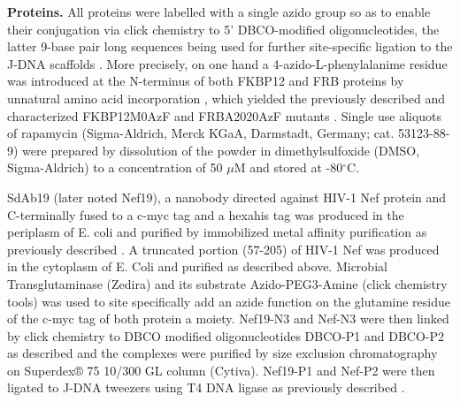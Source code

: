 \documentclass{biophys-new}
\begin{document}
\textbf{Proteins.} All proteins were labelled with a single azido group so as to enable their conjugation via click chemistry to 5' DBCO-modified oligonucleotides, the latter 9-base pair long sequences being used for further site-specific ligation to the J-DNA scaffolds  \cite{kostrz2019}. More precisely, on one hand a 4-azido-L-phenylalanime residue was introduced at the N-terminus of both FKBP12 and FRB proteins by unnatural amino acid incorporation \cite{chin2002, young2010, lajoie2013}, which yielded the previously described and characterized FKBP12M0AzF and FRBA2020AzF mutants  \cite{kostrz2019}.
Single use aliquots of rapamycin (Sigma-Aldrich, Merck KGaA, Darmstadt, Germany; cat. 53123-88-9) were prepared by dissolution of the powder in dimethylsulfoxide (DMSO, Sigma-Aldrich) to a concentration of 50 $\mu$M  and stored at -80$^{\circ}$C.

SdAb19 (later noted Nef19), a nanobody directed against HIV-1 Nef protein \cite{bouchet2011} and C-terminally fused to a c-myc tag and a hexahis tag was produced in the periplasm of E. coli and purified by immobilized metal affinity purification as previously described \cite{nevoltris2015}. A truncated portion (57-205) of HIV-1 Nef was produced in the cytoplasm of E. Coli and purified as described above. Microbial Transglutaminase (Zedira) and its substrate Azido-PEG3-Amine (click chemistry tools) was used to site specifically add an azide function on the glutamine residue of the c-myc tag of both protein a moiety. Nef19-N3 and Nef-N3 were then linked by click chemistry to DBCO modified oligonucleotides DBCO-P1 and DBCO-P2 as described \cite{kostrz2019} and the complexes were purified by size exclusion chromatography on Superdex® 75 10/300 GL column (Cytiva). Nef19-P1 and Nef-P2 were then ligated to J-DNA tweezers using T4 DNA ligase as previously described \cite{kostrz2019}.
\end{document}
